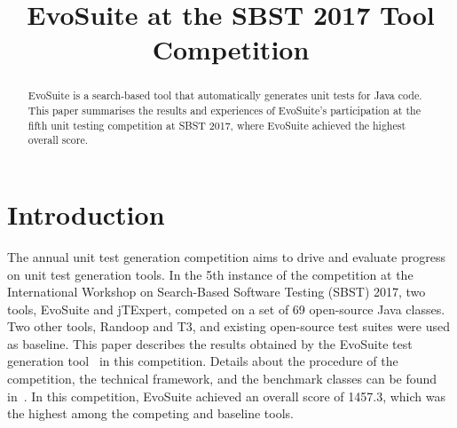 \documentclass[10pt,conference]{IEEEtran}
\newcommand{\EVOSUITE}{{\sc EvoSuite}\xspace}
\newcommand{\JTEXPERT}{{\sc jTExpert}\xspace}
\newcommand{\RANDOOP}{{\sc Randoop}\xspace}
\newcommand{\TT}{{\sc T3}\xspace}
\begin{document}
% 

\title{\EVOSUITE at the SBST 2017 Tool Competition}
 

\author{
\and
{}
}

\maketitle

\begin{abstract}
  \EVOSUITE is a search-based tool that automatically generates unit
  tests for Java code.  This paper summarises the results and
  experiences of \EVOSUITE's participation at the fifth unit testing
  competition at SBST 2017, where \EVOSUITE achieved the highest
  overall score.
\end{abstract}



\section{Introduction}
The annual unit test generation competition aims to drive and evaluate
progress on unit test generation tools. In the 5th instance of the
competition at the International Workshop on Search-Based Software
Testing (SBST) 2017, two tools, \EVOSUITE and \JTEXPERT, competed on a
set of 69 open-source Java classes. Two other tools, \RANDOOP and \TT,
and existing open-source test suites were used as baseline. This paper
describes the results obtained by the \EVOSUITE test generation
tool~\cite{FrA11c} in this competition. Details about the procedure of
the competition, the technical framework, and the benchmark classes
can be found in~\cite{sbst17competition}.  In this competition,
\EVOSUITE achieved an overall score of 1457.3, which was the highest
among the competing and baseline tools.
\end{document}
